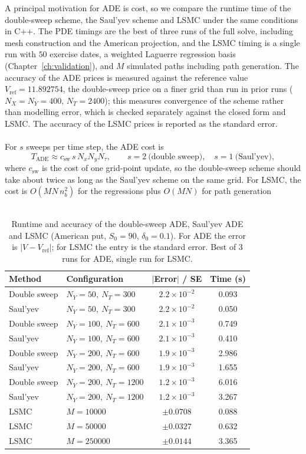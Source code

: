 \documentclass[12pt,a4paper]{article}
\begin{document}
A principal motivation for ADE is cost, so we compare the runtime time of the double-sweep scheme, the Saul'yev scheme and LSMC under the same conditions in C++.
The PDE timings are the best of three runs of the full solve, including mesh construction and the American projection, and the LSMC timing is a single run with $50$ exercise dates, a weighted Laguerre regression basis (Chapter~\ref{ch:validation}), and $M$ simulated paths including path generation. The accuracy of the ADE prices is measured against the reference value $V_{\mathrm{ref}}=11.892754$, the double-sweep price on a finer grid than run in prior runs ($N_X=N_Y=400$, $N_T=2400$); this measures convergence of the scheme rather than modelling error, which is checked separately against the closed form and LSMC. The accuracy of the LSMC prices is reported as the standard error.\\\\
For $s$ sweeps per time step, the ADE cost is
\begin{equation}
T_{\mathrm{ADE}}\approx c_{\mathrm{sw}}\,s\,N_xN_yN_\tau,\qquad s=2\ \text{(double sweep)},\quad s=1\ \text{(Saul'yev)},
\end{equation}
where $c_{\mathrm{sw}}$ is the cost of one grid-point update, so the double-sweep scheme should take about twice as long as the Saul'yev scheme on the same grid. For LSMC, the cost is $O(MN\,n_b^2)$ for the regressions plus $O(MN)$ for path generation\\\\ 
\begin{table}[h!]
\centering
\caption{Runtime and accuracy of the double-sweep ADE, Saul'yev ADE and LSMC (American put, $S_0=90$, $\delta_0=0.1$). For ADE the error is $|V-V_{\mathrm{ref}}|$; for LSMC the entry is the standard error. Best of 3 runs for ADE, single run for LSMC.}
\label{tab:runtime}
\begin{tabular}{llcc}
\hline
Method & Configuration & $|$Error$|$ / SE & Time (s) \\
\hline
Double sweep & $N_Y=50,\ N_T=300$ & $2.2\times10^{-2}$ & 0.093 \\
Saul'yev & $N_Y=50,\ N_T=300$ & $2.2\times10^{-2}$ & 0.050 \\
Double sweep & $N_Y=100,\ N_T=600$ & $2.1\times10^{-3}$ & 0.749 \\
Saul'yev & $N_Y=100,\ N_T=600$ & $2.1\times10^{-3}$ & 0.410 \\
Double sweep & $N_Y=200,\ N_T=600$ & $1.9\times10^{-3}$ & 2.986 \\
Saul'yev & $N_Y=200,\ N_T=600$ & $1.9\times10^{-3}$ & 1.655 \\
Double sweep & $N_Y=200,\ N_T=1200$ & $1.2\times10^{-3}$ & 6.016 \\
Saul'yev & $N_Y=200,\ N_T=1200$ & $1.2\times10^{-3}$ & 3.267 \\
\hline
LSMC & $M=10000$ & $\pm0.0708$ & 0.088 \\
LSMC & $M=50000$ & $\pm0.0327$ & 0.632 \\
LSMC & $M=250000$ & $\pm0.0144$ & 3.365 \\
\hline
\end{tabular}
\end{table}
 
\end{document}
